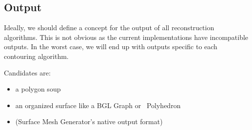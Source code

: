 \subsection{Output}

Ideally, we should define a concept for the output of all reconstruction algorithms.
This is not obvious as the current implementations have incompatible
outputs. In the worst case, we will end up with outputs specific to
each contouring algorithm.

Candidates are:

\begin{itemize}
\item a polygon soup
\item an organized surface like a BGL Graph or \cgal\ Polyhedron
\item {} (Surface Mesh Generator's
native output format)
\end{itemize}

